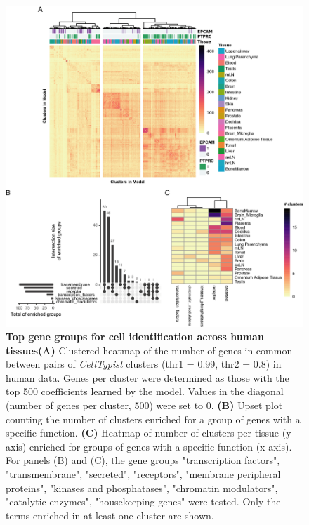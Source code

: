 \begin{figure}[pht!]
    \centering
    \includegraphics[scale=0.835]{Chapter4/Figs/chap4_genesAnalysis.png} %
    \caption[Top gene groups for cell identification across human tissues]{\textbf{Top gene groups for cell identification across human tissues}\newline\textbf{(A)} Clustered heatmap of the number of genes in common between pairs of \textit{CellTypist} clusters (thr1 = 0.99, thr2 = 0.8) in human data. Genes per cluster were determined as those with the top 500 coefficients learned by the model. Values in the diagonal (number of genes per cluster, 500) were set to 0. \textbf{(B)} Upset plot counting the number of clusters enriched for a group of genes with a specific function. \textbf{(C)} Heatmap of number of clusters per tissue (y-axis) enriched for groups of genes with a specific function (x-axis). For panels (B) and (C), the gene groups "transcription factors", "transmembrane", "secreted", "receptors", "membrane peripheral proteins", "kinases and phosphatases", "chromatin modulators", "catalytic enzymes", "housekeeping genes" were tested. Only the terms enriched in at least one cluster are shown.}
    \label{fig:chap4_genetypes}
\end{figure}

